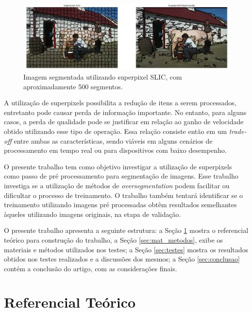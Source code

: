 \begin{document}
\begin{figure}[ht]
\centering
\includegraphics[width=1.\textwidth]{superpixels.png}
\caption{Imagem segmentada utilizando superpixel SLIC, com aproximadamente 500 segmentos.}
\label{fig:superpixel}
\end{figure}

A utilização de superpixels possibilita a redução de itens a serem processados, entretanto pode causar perda de informação importante. No entanto, para alguns casos, a perda de qualidade pode se justificar em relação ao ganho de velocidade obtido utilizando esse tipo de operação. Essa relação consiste então em um \textit{trade-off} entre ambas as características, sendo viáveis em alguns cenários de processamento em tempo real ou para dispositivos com baixo desempenho.

O presente trabalho tem como objetivo investigar a utilização de superpixels como passo de pré processamento para segmentação de imagens. Esse trabalho investiga se a utilização de métodos de \textit{oversegmentation} podem facilitar ou dificultar o processo de treinamento. O trabalho também tentará identificar se o treinamento utilizando imagens pré processadas obtêm resultados semelhantes àqueles utilizando imagens originais, na etapa de validação.

O presente trabalho apresenta a seguinte estrutura: a Seção \ref{sec:ref_teorico} mostra o referencial teórico para construção do trabalho, a Seção  \ref{sec:mat_metodos}, exibe os materiais e métodos utilizados nos testes; a Seção \ref{sec:testes} mostra os resultados obtidos nos testes realizados e a discussões dos mesmos; a Seção \ref{sec:conclusao} contém a conclusão do artigo, com as considerações finais.



\section{Referencial Teórico} \label{sec:ref_teorico}
\end{document}
